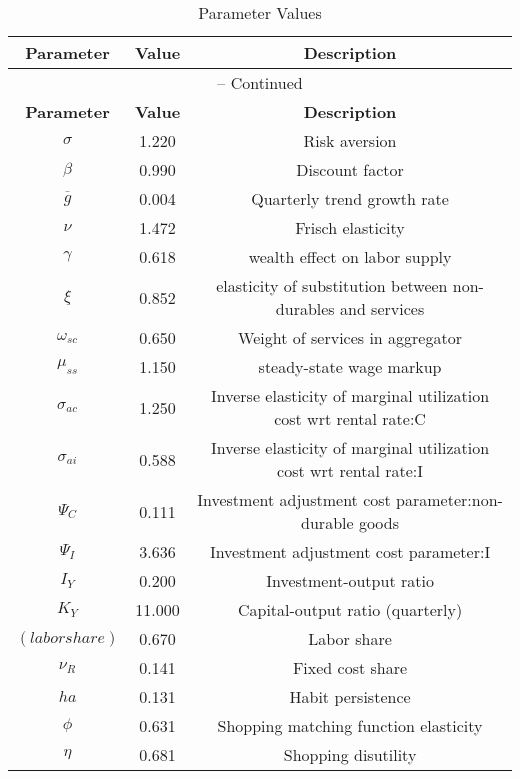 \begin{center}
\begin{longtable}{ccc}
\caption{Parameter Values}\\%
\toprule%
\multicolumn{1}{c}{\textbf{Parameter}} &
\multicolumn{1}{c}{\textbf{Value}} &
 \multicolumn{1}{c}{\textbf{Description}}\\%
\midrule%
\endfirsthead
\multicolumn{3}{c}{{\tablename} \thetable{} -- Continued}\\%
\midrule%
\multicolumn{1}{c}{\textbf{Parameter}} &
\multicolumn{1}{c}{\textbf{Value}} &
  \multicolumn{1}{c}{\textbf{Description}}\\%
\midrule%
\endhead
${\sigma}$ 	 & 	 1.220 	 & 	 Risk aversion\\
${\beta}$ 	 & 	 0.990 	 & 	 Discount factor\\
${\overline{g}}$ 	 & 	 0.004 	 & 	 Quarterly trend growth rate\\
$\nu$ 	 & 	 1.472 	 & 	 Frisch elasticity\\
$\gamma$ 	 & 	 0.618 	 & 	 wealth effect on labor supply\\
$\xi$ 	 & 	 0.852 	 & 	 elasticity of substitution between non-durables and services\\
$\omega_{sc}$ 	 & 	 0.650 	 & 	 Weight of services in aggregator\\
$\mu_{ss}$ 	 & 	 1.150 	 & 	 steady-state wage markup\\
${\sigma_{ac}}$ 	 & 	 1.250 	 & 	 Inverse elasticity of marginal utilization cost wrt rental rate:C\\
${\sigma_{ai}}$ 	 & 	 0.588 	 & 	 Inverse elasticity of marginal utilization cost wrt rental rate:I\\
${\Psi_{C}}$ 	 & 	 0.111 	 & 	 Investment adjustment cost parameter:non-durable goods\\
${\Psi_I}$ 	 & 	 3.636 	 & 	 Investment adjustment cost parameter:I\\
${I_Y}$ 	 & 	 0.200 	 & 	 Investment-output ratio\\
${K_Y}$ 	 & 	 11.000 	 & 	 Capital-output ratio (quarterly)\\
$(labor share)$ 	 & 	 0.670 	 & 	 Labor share\\
${\nu_R}$ 	 & 	 0.141 	 & 	 Fixed cost share\\
${ha}$ 	 & 	 0.131 	 & 	 Habit persistence\\
${\phi}$ 	 & 	 0.631 	 & 	 Shopping matching function elasticity\\
${\eta}$ 	 & 	 0.681 	 & 	 Shopping disutility\\

\end{longtable}
\end{center}
